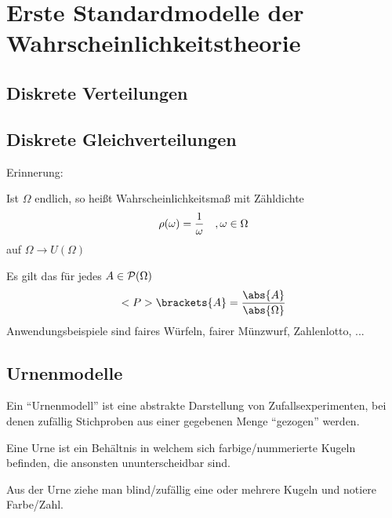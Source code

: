 \chapter{Erste Standardmodelle der Wahrscheinlichkeitstheorie}

\section*{Diskrete Verteilungen}

\section{Diskrete Gleichverteilungen}


Erinnerung:
\begin{*erinnerung}[\propref{1_10}]
	Ist $\Omega$ endlich, so heißt Wahrscheinlichkeitsmaß mit Zähldichte
	\begin{align}
		\rho(\omega) = \frac{1}{\omega}\quad, \omega \in \Omega\notag
	\end{align}
	 auf $\Omega \to U(\Omega)$
\end{*erinnerung}
Es gilt das für jedes $A \in \mathcal{P}(\Omega)$
\begin{align}
	\probp\brackets{A} = \frac{\abs{A}}{\abs{\Omega}} \notag
\end{align}
Anwendungsbeispiele sind faires Würfeln, fairer Münzwurf, Zahlenlotto, ...

\section{Urnenmodelle}

Ein ``Urnenmodell'' ist eine abstrakte Darstellung von Zufallsexperimenten, bei denen zufällig Stichproben aus einer gegebenen Menge ``gezogen'' werden.
\begin{*definition}[Urne]
	Eine Urne ist ein Behältnis in welchem sich farbige/nummerierte Kugeln befinden, die ansonsten ununterscheidbar sind.
\end{*definition}
Aus der Urne ziehe man blind/zufällig eine oder mehrere Kugeln und notiere Farbe/Zahl.

